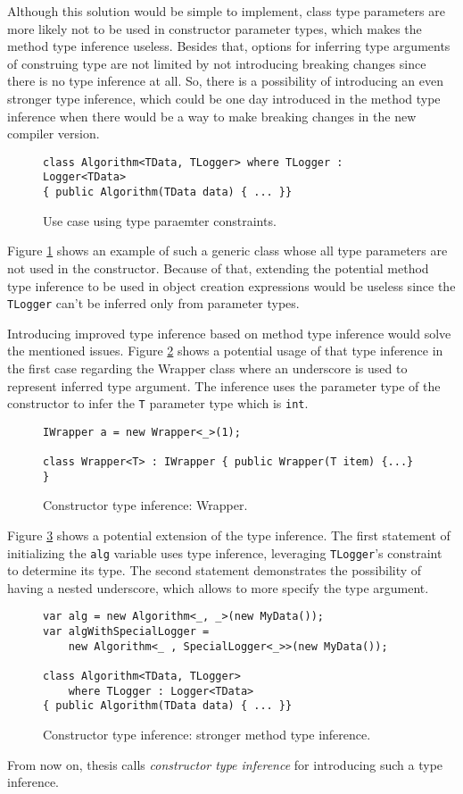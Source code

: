 Although this solution would be simple to implement, class type parameters are more likely not to be used in constructor parameter types, which makes the method type inference useless. 
Besides that, options for inferring type arguments of construing type are not limited by not introducing breaking changes since there is no type inference at all. 
So, there is a possibility of introducing an even stronger type inference, which could be one day introduced in the method type inference when there would be a way to make breaking changes in the new compiler version. 
\begin{figure}[h!]
\begin{lstlisting}[style=csharp]
class Algorithm<TData, TLogger> where TLogger : Logger<TData> 
{ public Algorithm(TData data) { ... }}
\end{lstlisting}
\caption{Use case using type paraemter constraints.}
\label{img36:cti}
\end{figure}
Figure \ref{img36:cti} shows an example of such a generic class whose all type parameters are not used in the constructor.
Because of that, extending the potential method type inference to be used in object creation expressions would be useless since the \texttt{TLogger} can’t be inferred only from parameter types.
\par
Introducing improved type inference based on method type inference would solve the mentioned issues. 
Figure \ref{img37:sol1} shows a potential usage of that type inference in the first case regarding the Wrapper class where an underscore is used to represent inferred type argument. 
The inference uses the parameter type of the constructor to infer the \texttt{T} parameter type which is \texttt{int}.
\begin{figure}[h]
\begin{lstlisting}[style=csharp]
IWrapper a = new Wrapper<_>(1);

class Wrapper<T> : IWrapper { public Wrapper(T item) {...} }
\end{lstlisting}
\caption{Constructor type inference: Wrapper.}
\label{img37:sol1}
\end{figure}
\par
Figure \ref{img38:sol2} shows a potential extension of the type inference. 
The first statement of initializing the \texttt{alg} variable uses type inference, leveraging \texttt{TLogger}’s constraint to determine its type. 
The second statement demonstrates the possibility of having a nested underscore, which allows to more specify the type argument.
\begin{figure}[h]
\begin{lstlisting}[style=csharp]
var alg = new Algorithm<_, _>(new MyData());
var algWithSpecialLogger = 
    new Algorithm<_ , SpecialLogger<_>>(new MyData());

class Algorithm<TData, TLogger> 
    where TLogger : Logger<TData> 
{ public Algorithm(TData data) { ... }}
\end{lstlisting}
\caption{Constructor type inference: stronger method type inference.}
\label{img38:sol2}
\end{figure}
\par
From now on, thesis calls \textit{constructor type inference} for introducing such a type inference.

